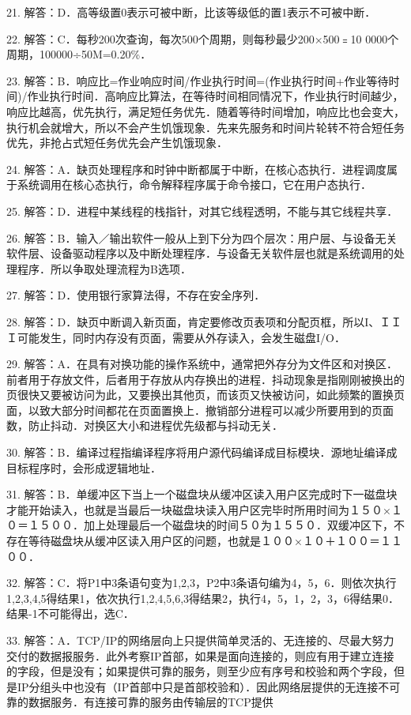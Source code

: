 21. 解答：D．高等级置0表示可被中断，比该等级低的置1表示不可被中断．

22. 解答：C．每秒200次查询，每次500个周期，则每秒最少200×500﹦10 0000个周期，100000÷50M=0.20\%．

23. 解答：B．响应比=作业响应时间/作业执行时间=(作业执行时间+作业等待时间)/作业执行时间．高响应比算法，在等待时间相同情况下，作业执行时间越少，响应比越高，优先执行，满足短任务优先．随着等待时间增加，响应比也会变大，执行机会就增大，所以不会产生饥饿现象．先来先服务和时间片轮转不符合短任务优先，非抢占式短任务优先会产生饥饿现象．

24. 解答：A．缺页处理程序和时钟中断都属于中断，在核心态执行．进程调度属于系统调用在核心态执行，命令解释程序属于命令接口，它在用户态执行．

25. 解答：D．进程中某线程的栈指针，对其它线程透明，不能与其它线程共享．

26. 解答：B．输入／输出软件一般从上到下分为四个层次：用户层、与设备无关软件层、设备驱动程序以及中断处理程序．与设备无关软件层也就是系统调用的处理程序．所以争取处理流程为B选项．

27. 解答：D．使用银行家算法得，不存在安全序列．

28. 解答：D．缺页中断调入新页面，肯定要修改页表项和分配页框，所以I、ＩＩＩ可能发生，同时内存没有页面，需要从外存读入，会发生磁盘I/O．

29. 解答：A．在具有对换功能的操作系统中，通常把外存分为文件区和对换区．前者用于存放文件，后者用于存放从内存换出的进程．抖动现象是指刚刚被换出的页很快又要被访问为此，又要换出其他页，而该页又快被访问，如此频繁的置换页面，以致大部分时间都花在页面置换上．撤销部分进程可以减少所要用到的页面数，防止抖动．对换区大小和进程优先级都与抖动无关．

30. 解答：B．编译过程指编译程序将用户源代码编译成目标模块．源地址编译成目标程序时，会形成逻辑地址．

31. 解答：B．单缓冲区下当上一个磁盘块从缓冲区读入用户区完成时下一磁盘块才能开始读入，也就是当最后一块磁盘块读入用户区完毕时所用时间为１５０×１０＝１５００．加上处理最后一个磁盘块的时间５０为１５５０．双缓冲区下，不存在等待磁盘块从缓冲区读入用户区的问题，也就是１００×１０＋１００＝１１００．

32. 解答：C．将P1中3条语句变为1,2,3，P2中3条语句编为4，5，6．则依次执行1,2,3,4,5得结果1，依次执行1,2,4,5,6,3得结果2，执行4，5，1，2，3，6得结果0．结果-1不可能得出，选C．

33. 解答：A．TCP/IP的网络层向上只提供简单灵活的、无连接的、尽最大努力交付的数据报服务．此外考察IP首部，如果是面向连接的，则应有用于建立连接的字段，但是没有；如果提供可靠的服务，则至少应有序号和校验和两个字段，但是IP分组头中也没有（IP首部中只是首部校验和）．因此网络层提供的无连接不可靠的数据服务．有连接可靠的服务由传输层的TCP提供

